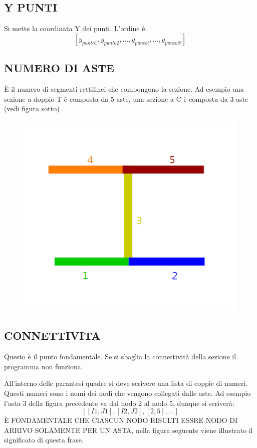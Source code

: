\documentclass[12pt  , a4, titlepage]{article}
\newcommand{\E}{\`E }
\begin{document}
	\subsection*{Y PUNTI}
	Si mette la coordinata Y dei punti. L'ordine è:
	\[
	[y_{punto1}, y_{punto2}, \dots , y_{punto i} , \dots, y_{puntoN}]
	\]
	\subsection*{NUMERO DI ASTE}
	\E il numero di segmenti rettilinei che compongono la sezione. Ad esempio una sezione a doppio T è composta da 5 aste, una sezione a C è composta da 3 aste (vedi figura sotto)
.
		\begin{figure}[h!]
	\centering
	\includegraphics[width=0.5\linewidth]{FIGURE/NUM_ASTE}
	\caption{}
	\label{fig:NUM_ASTE}
\end{figure}

\subsection*{CONNETTIVITA}
	Questo è il punto fondamentale. Se si sbaglia la connettività della sezione il programma non funziona.
	
	All'interno delle parantesi quadre si deve scrivere una lista di coppie di numeri. Questi numeri sono i nomi dei nodi che vengono collegati dalle aste. Ad esempio l'asta 3 della figura precedente va dal nodo 2 al nodo 5, dunque si  scriverà:
	\[
	[[I1,J1],[I2,J2], [2,5],\dots]
	\]
	\E FONDAMENTALE CHE CIASCUN NODO RISULTI ESSRE NODO DI ARRIVO SOLAMENTE PER UN ASTA, nella figura seguente viene illustrato il significato di questa frase.
	
\end{document}
